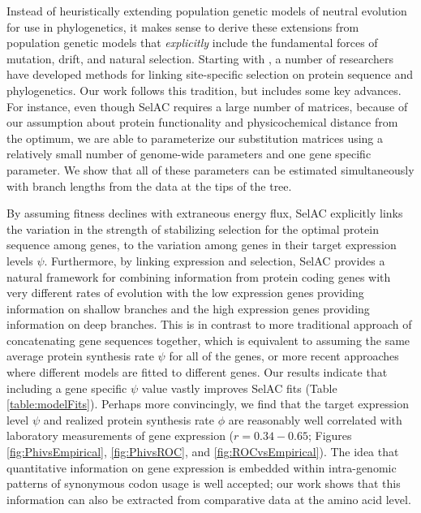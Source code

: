 \documentclass[12pt,letterpaper]{article}
\newcommand{\selac}{SelAC\xspace}
\begin{document}
Instead of heuristically extending population genetic models of neutral evolution for use in phylogenetics, it makes sense to derive these extensions from population genetic models that \emph{explicitly} include the fundamental forces of mutation, drift, and natural selection.
Starting with \citet{HalpernAndBruno1998}, a number of researchers have developed methods for linking site-specific selection on protein sequence and phylogenetics\citep[e.g.~][]{KoshiEtAl1999,DimmicEtAl2000,KoshiAndGoldstein2001,RobinsonEtAl2003,LartillotAndPhilippe2004,ThorneEtAl2012,RodrigueAndLartillot2014}. %
Our work follows this tradition, but includes some key advances.
For instance, even though \selac requires a large number of matrices, because of our assumption about protein functionality and physicochemical distance from the optimum, we are able to parameterize our substitution matrices using a relatively small number of genome-wide parameters and one gene specific parameter.
We show that all of these parameters can be estimated simultaneously with branch lengths from the data at the tips of the tree.


By assuming fitness declines with extraneous energy flux, \selac explicitly links the variation in the strength of stabilizing selection for the optimal protein sequence among genes, to the variation among genes in their target expression levels $\psi$.
Furthermore, by linking expression and selection, \selac provides a natural framework for combining information from protein coding genes with very different rates of evolution with the low expression genes providing information on shallow branches and the high expression genes providing information on deep branches.
This is in contrast to more traditional approach of concatenating gene sequences together, which is equivalent to assuming the same average protein synthesis rate $\psi$ for all of the genes, or more recent approaches where different models are fitted to different genes.
Our results indicate that including a gene specific $\psi$ value vastly improves \selac fits (Table \ref{table:modelFits}).
Perhaps more convincingly, we find that the target expression level $\psi$ and realized protein synthesis rate $\phi$ are reasonably well correlated with laboratory measurements of gene expression ($r= 0.34-0.65$; Figures \ref{fig:PhivsEmpirical}, \ref{fig:PhivsROC}, and \ref{fig:ROCvsEmpirical}).
The idea that quantitative information on gene expression is embedded within intra-genomic patterns of synonymous codon usage is well accepted; our work shows that this information can also be extracted from comparative data at the amino acid level.
\end{document}
